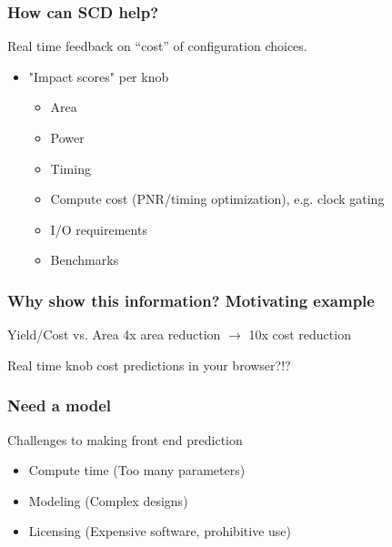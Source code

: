 \documentclass[aspectratio=169]{beamer}
\begin{document}
\begin{frame}
    \frametitle{How can SCD help?}
    Real time feedback on “cost” of configuration choices.
    \begin{itemize}
        \item "Impact scores" per knob
        \begin{itemize}
            \item Area
            \item Power
            \item Timing
            \item Compute cost (PNR/timing optimization), e.g. clock gating
            \item I/O requirements
            \item Benchmarks 
        \end{itemize}
    \end{itemize}
\end{frame}

\begin{frame}
    \frametitle{Why show this information? Motivating example}
    Yield/Cost vs. Area
    4x area reduction $\rightarrow$ 10x cost reduction

\end{frame}

               {Real time knob cost predictions in your browser?!?} %
               {} %

\begin{frame}
    \frametitle{Need a model}
    Challenges to making front end prediction
    \begin{itemize}
        \item Compute time (Too many parameters)
        \item Modeling (Complex designs)
        \item Licensing (Expensive software, prohibitive use)
    \end{itemize}
\end{frame}
\end{document}
